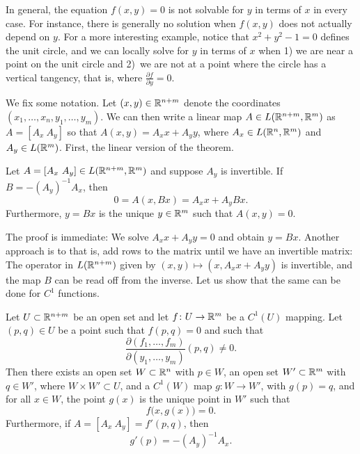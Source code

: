 In general, the equation $f(x,y) = 0$ is
not solvable for $y$ in terms of $x$ in every case.
For instance, there is generally no solution
when $f(x,y)$ does not actually depend on $y$.
For a more interesting example, notice that $x^2+y^2-1 = 0$ defines the unit circle, and
we can locally solve for $y$ in terms of $x$ when 1) we are near
a point on the unit circle and 2)~we are not at a point
where the circle has a vertical tangency, that is, where
$\frac{\partial f}{\partial y} = 0$.

We fix some notation.  Let $(x,y) \in
{\mathbb{R}}^{n+m}$ denote the coordinates $(x_1,\ldots,x_n,y_1,\ldots,y_m)$.  
We can then write a
linear map $A \in L({\mathbb{R}}^{n+m},{\mathbb{R}}^m)$ as
$A = [ A_x ~ A_y ]$ so that $A(x,y) = A_x x + A_y y$,
where $A_x \in L({\mathbb{R}}^n,{\mathbb{R}}^m)$ and
$A_y \in L({\mathbb{R}}^m)$.
First, the linear version of the theorem.

\begin{prop}
Let $A = [A_x~A_y] \in L({\mathbb{R}}^{n+m},{\mathbb{R}}^m)$ and suppose 
$A_y$ is invertible.  If $B = - {(A_y)}^{-1} A_x$, then
\begin{equation*}
0 = A ( x, Bx) = A_x x + A_y Bx .
\end{equation*}
Furthermore, $y=Bx$ is the unique $y \in {\mathbb{R}}^m$ such that $A(x,y) = 0$.
\end{prop}

The proof is immediate: We solve $A_x x +A_y y = 0$ and obtain $y = Bx$.
Another approach is to  that is, add
rows to the matrix until we have an invertible matrix:
The operator in $L({\mathbb{R}}^{n+m})$ given by
$(x,y) \mapsto (x,A_x x + A_y y)$
is invertible, and the map $B$
can be read off from the inverse.
Let us show that the same can be done for $C^1$ functions.

\begin{thm}
\label{thm:implicit}
Let $U \subset {\mathbb{R}}^{n+m}$ be an open set and let $f \colon U \to {\mathbb{R}}^m$
be a $C^1(U)$ mapping.  Let $(p,q) \in U$ be a point such that
$f(p,q) = 0$ and such that
\begin{equation*}
\frac{\partial(f_1,\ldots,f_m)}{\partial(y_1,\ldots,y_m)} (p,q)  \neq 0 .
\end{equation*}
Then there exists an
open set $W \subset {\mathbb{R}}^n$ with $p \in W$,
an open set $W' \subset {\mathbb{R}}^m$ with $q \in W'$,
where $W \times W' \subset U$,
and
a $C^1(W)$ map $g \colon W \to W'$, with $g(p) = q$, and
for all $x \in W$, the point $g(x)$ is the unique point in $W'$
such that 
\begin{equation*}
f\bigl(x,g(x)\bigr) = 0 .
\end{equation*}
Furthermore, if $A = [ A_x ~ A_y ] = f'(p,q)$, then
\begin{equation*}
g'(p) = -{(A_y)}^{-1}A_x .
\end{equation*}
\end{thm}


